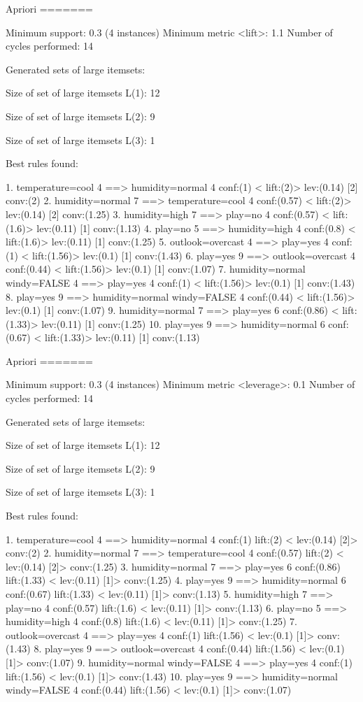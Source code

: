 \documentclass[a4paper,12pt]{article}
\begin{document}
Apriori
=======

Minimum support: 0.3 (4 instances)
Minimum metric <lift>: 1.1
Number of cycles performed: 14

Generated sets of large itemsets:

Size of set of large itemsets L(1): 12

Size of set of large itemsets L(2): 9

Size of set of large itemsets L(3): 1

Best rules found:

 1. temperature=cool 4 ==> humidity=normal 4    conf:(1) < lift:(2)> lev:(0.14) [2] conv:(2)
 2. humidity=normal 7 ==> temperature=cool 4    conf:(0.57) < lift:(2)> lev:(0.14) [2] conv:(1.25)
 3. humidity=high 7 ==> play=no 4    conf:(0.57) < lift:(1.6)> lev:(0.11) [1] conv:(1.13)
 4. play=no 5 ==> humidity=high 4    conf:(0.8) < lift:(1.6)> lev:(0.11) [1] conv:(1.25)
 5. outlook=overcast 4 ==> play=yes 4    conf:(1) < lift:(1.56)> lev:(0.1) [1] conv:(1.43)
 6. play=yes 9 ==> outlook=overcast 4    conf:(0.44) < lift:(1.56)> lev:(0.1) [1] conv:(1.07)
 7. humidity=normal windy=FALSE 4 ==> play=yes 4    conf:(1) < lift:(1.56)> lev:(0.1) [1] conv:(1.43)
 8. play=yes 9 ==> humidity=normal windy=FALSE 4    conf:(0.44) < lift:(1.56)> lev:(0.1) [1] conv:(1.07)
 9. humidity=normal 7 ==> play=yes 6    conf:(0.86) < lift:(1.33)> lev:(0.11) [1] conv:(1.25)
10. play=yes 9 ==> humidity=normal 6    conf:(0.67) < lift:(1.33)> lev:(0.11) [1] conv:(1.13)


Apriori
=======

Minimum support: 0.3 (4 instances)
Minimum metric <leverage>: 0.1
Number of cycles performed: 14

Generated sets of large itemsets:

Size of set of large itemsets L(1): 12

Size of set of large itemsets L(2): 9

Size of set of large itemsets L(3): 1

Best rules found:

 1. temperature=cool 4 ==> humidity=normal 4    conf:(1) lift:(2) < lev:(0.14) [2]> conv:(2)
 2. humidity=normal 7 ==> temperature=cool 4    conf:(0.57) lift:(2) < lev:(0.14) [2]> conv:(1.25)
 3. humidity=normal 7 ==> play=yes 6    conf:(0.86) lift:(1.33) < lev:(0.11) [1]> conv:(1.25)
 4. play=yes 9 ==> humidity=normal 6    conf:(0.67) lift:(1.33) < lev:(0.11) [1]> conv:(1.13)
 5. humidity=high 7 ==> play=no 4    conf:(0.57) lift:(1.6) < lev:(0.11) [1]> conv:(1.13)
 6. play=no 5 ==> humidity=high 4    conf:(0.8) lift:(1.6) < lev:(0.11) [1]> conv:(1.25)
 7. outlook=overcast 4 ==> play=yes 4    conf:(1) lift:(1.56) < lev:(0.1) [1]> conv:(1.43)
 8. play=yes 9 ==> outlook=overcast 4    conf:(0.44) lift:(1.56) < lev:(0.1) [1]> conv:(1.07)
 9. humidity=normal windy=FALSE 4 ==> play=yes 4    conf:(1) lift:(1.56) < lev:(0.1) [1]> conv:(1.43)
10. play=yes 9 ==> humidity=normal windy=FALSE 4    conf:(0.44) lift:(1.56) < lev:(0.1) [1]> conv:(1.07)
\end{document}
